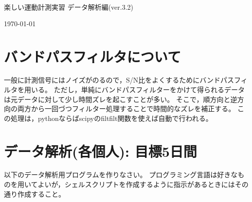 \documentclass{jsarticle}
\def\version{3.2}
\begin{document}
\begin{center}
  {\LARGE 楽しい運動計測実習 データ解析編(ver.\version)}
\end{center}
\begin{flushright}
\today
\end{flushright}





\section{バンドパスフィルタについて}  
一般に計測信号にはノイズがのるので，S/N比をよくするためにバンドパスフィルタを用いる。
ただし，単純にバンドパスフィルターをかけて得られるデータは元データに対して少し時間ズレを起こすことが多い。
そこで，順方向と逆方向の両方から一回づつフィルター処理することで時間的なズレを補正する。
この処理は，pythonならばscipyのfiltfilt関数を使えば自動で行われる。

\section{データ解析(各個人): 目標5日間}
以下のデータ解析用プログラムを作りなさい。
プログラミング言語は好きなものを用いてよいが，シェルスクリプトを作成するように指示があるときにはその通り作成すること。
\end{document}
